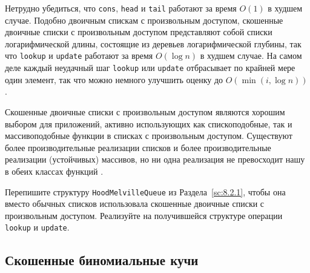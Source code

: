 \begin{frame}[fragile]{}

Нетрудно убедиться, что \lstinline!cons!, \lstinline!head! и
\lstinline!tail! работают за время $O(1)$ в худшем случае. Подобно
двоичным спискам с произвольным доступом, скошенные двоичные списки с
произвольным доступом представляют собой списки логарифмической длины,
состоящие из деревьев логарифмической глубины, так что
\lstinline!lookup! и \lstinline!update! работают за время $O(\log n)$
в худшем случае. На самом деле каждый неудачный шаг \lstinline!lookup!
или \lstinline!update! отбрасывает по крайней мере один элемент, так
что можно немного улучшить оценку до $O(\min(i, \log n))$.

\begin{hint}
  Скошенные двоичные списки с произвольным доступом являются хорошим
  выбором для приложений, активно использующих как спископодобные, так
  и массивоподобные функции в списках с произвольным
  доступом. Существуют более производительные реализации списков и
  более производительные реализации (устойчивых) массивов, но ни одна
  реализация не превосходит нашу в обеих классах функций \cite{Okasaki1995b}.
\end{hint}

\begin{exercise}\label{ex:9.14}
  Перепишите структуру \lstinline!HoodMelvilleQueue! из
  Раздела~\ref{sc:8.2.1}, чтобы она вместо обычных списков
  использовала скошенные двоичные списки с произвольным
  доступом. Реализуйте на получившейся структуре операции
  \lstinline!lookup! и \lstinline!update!.
\end{exercise}

\end{frame}

\subsection{Скошенные биномиальные кучи}
\label{sc:9.3.2}

